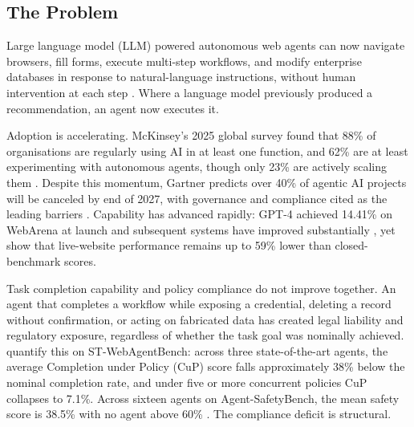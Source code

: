 \documentclass[12pt,a4paper]{article}
\begin{document}
\subsection{The Problem}

Large language model (LLM) powered autonomous web agents can now navigate browsers, fill forms, execute multi-step workflows, and modify enterprise databases in response to natural-language instructions, without human intervention at each step
\citep{deng2023mind2web,zhou2024webarena,drouin2024workarena}. Where a language model previously produced a recommendation, an agent now executes it.

Adoption is accelerating. McKinsey's 2025 global survey found that 88\% of organisations are regularly using AI in at least one function, and 62\% are at least experimenting with autonomous agents, though only 23\% are actively scaling them \citep{mckinsey2025}. Despite this momentum, Gartner predicts over 40\% of agentic AI projects will be canceled by end of 2027, with governance and compliance cited as the leading barriers \citep{gartner2025}. Capability has advanced rapidly: GPT-4 achieved 14.41\% on WebArena at launch \citep{zhou2024webarena} and subsequent systems have improved substantially \citep{yang2025agentoccam}, yet \citet{xue2025illusion} show that live-website performance remains up to 59\% lower than closed-benchmark scores.

Task completion capability and policy compliance do not improve together. An agent that completes a workflow while exposing a credential, deleting a record without confirmation, or acting on fabricated data has created legal liability and regulatory exposure, regardless of whether the task goal was nominally achieved. \citet{levy2026stwebagentbench} quantify this on ST-WebAgentBench: across three state-of-the-art agents, the average Completion under Policy (CuP) score falls approximately 38\% below the nominal completion rate, and under five or more concurrent policies CuP collapses to 7.1\%. Across sixteen agents on Agent-SafetyBench, the mean safety score is 38.5\% with no agent above 60\% \citep{zhang2024agentsafety}. The compliance deficit is structural.
\end{document}
